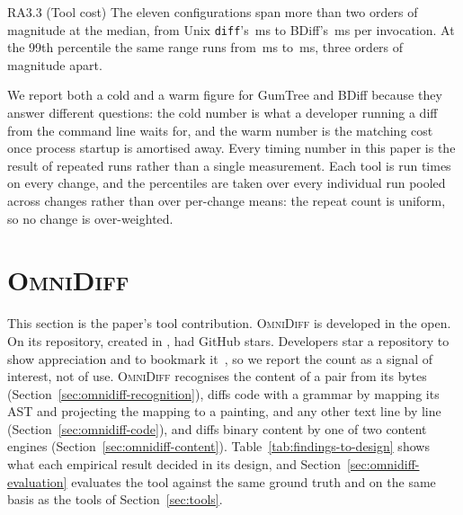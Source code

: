 \documentclass[sigconf,review]{acmart}
\begin{document}
\begin{resultbox}{RA3.3 (Tool cost)}
The eleven configurations span more than two orders of magnitude at the median, from Unix
\texttt{diff}'s \SpeedUnixDiffPFifty{}\,ms to BDiff's \SpeedBDiffColdPFifty{}\,ms per
invocation. At the 99th percentile the same range runs from \SpeedUnixDiffPNinetyNine{}\,ms to
\SpeedGumTreeColdPNinetyNine{}\,ms, three orders of magnitude apart.
\end{resultbox}

We report both a cold and a warm figure for GumTree and BDiff because they answer different
questions: the cold number is what a developer running a diff from the command line waits for,
and the warm number is the matching cost once process startup is amortised away. Every timing
number in this paper is the result of repeated runs rather than a single measurement. Each tool
is run \TimingRepeats{} times on every change, and the percentiles are taken over every
individual run pooled across changes rather than over per-change means: the repeat count is
uniform, so no change is over-weighted.

\section{\textsc{OmniDiff}}
\label{sec:omnidiff}

This section is the paper's tool contribution. \textsc{OmniDiff} is developed in the open. On
\ProjectStatsDate{} its repository, created in \ProjectCreated{}, had \ProjectStars{} GitHub stars. Developers star a repository to show appreciation and to bookmark
it~\cite{borges-stars-2018}, so we report the count as a signal of interest, not of use.
\textsc{OmniDiff} recognises the content of a pair from its bytes (Section~\ref{sec:omnidiff-recognition}),
diffs code with a grammar by mapping its AST and projecting the mapping to a painting, and any
other text line by line (Section~\ref{sec:omnidiff-code}), and diffs binary content by one of
two content engines (Section~\ref{sec:omnidiff-content}). Table~\ref{tab:findings-to-design}
shows what each empirical result decided in its design, and Section~\ref{sec:omnidiff-evaluation}
evaluates the tool against the same ground truth and on the same basis as the tools of
Section~\ref{sec:tools}.
\end{document}
